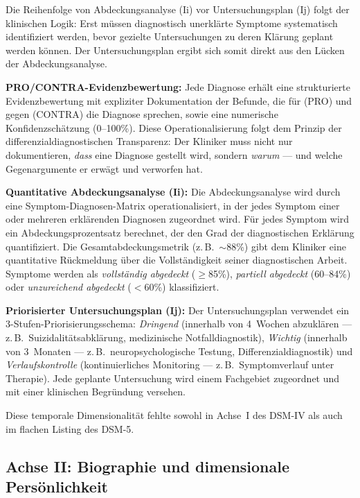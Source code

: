 \documentclass[11pt,a4paper]{article}
\begin{document}
Die Reihenfolge von Abdeckungsanalyse (Ii) vor Untersuchungsplan (Ij) folgt der klinischen Logik: Erst m\"ussen diagnostisch unerklärte Symptome systematisch identifiziert werden, bevor gezielte Untersuchungen zu deren Kl\"arung geplant werden k\"onnen. Der Untersuchungsplan ergibt sich somit direkt aus den L\"ucken der Abdeckungsanalyse.

\textbf{PRO/CONTRA-Evidenzbewertung:} Jede Diagnose erh\"alt eine strukturierte Evidenzbewertung mit expliziter Dokumentation der Befunde, die f\"ur (PRO) und gegen (CONTRA) die Diagnose sprechen, sowie eine numerische Konfidenzsch\"atzung (0--100\%). Diese Operationalisierung folgt dem Prinzip der differenzialdiagnostischen Transparenz: Der Kliniker muss nicht nur dokumentieren, \textit{dass} eine Diagnose gestellt wird, sondern \textit{warum} --- und welche Gegenargumente er erw\"agt und verworfen hat.

\textbf{Quantitative Abdeckungsanalyse (Ii):} Die Abdeckungsanalyse wird durch eine Symptom-Diagnosen-Matrix operationalisiert, in der jedes Symptom einer oder mehreren erkl\"arenden Diagnosen zugeordnet wird. F\"ur jedes Symptom wird ein Abdeckungsprozentsatz berechnet, der den Grad der diagnostischen Erkl\"arung quantifiziert. Die Gesamtabdeckungsmetrik (z.\,B.\ $\sim$88\%) gibt dem Kliniker eine quantitative R\"uckmeldung \"uber die Vollst\"andigkeit seiner diagnostischen Arbeit. Symptome werden als \textit{vollst\"andig abgedeckt} ($\geq$85\%), \textit{partiell abgedeckt} (60--84\%) oder \textit{unzureichend abgedeckt} ($<$60\%) klassifiziert.

\textbf{Priorisierter Untersuchungsplan (Ij):} Der Untersuchungsplan verwendet ein 3-Stufen-Priorisierungsschema: \textit{Dringend} (innerhalb von 4~Wochen abzukl\"aren --- z.\,B.\ Suizidalit\"atsabkl\"arung, medizinische Notfalldiagnostik), \textit{Wichtig} (innerhalb von 3~Monaten --- z.\,B.\ neuropsychologische Testung, Differenzialdiagnostik) und \textit{Verlaufskontrolle} (kontinuierliches Monitoring --- z.\,B.\ Symptomverlauf unter Therapie). Jede geplante Untersuchung wird einem Fachgebiet zugeordnet und mit einer klinischen Begr\"undung versehen.

Diese temporale Dimensionalit\"at fehlte sowohl in Achse~I des DSM-IV als auch im flachen Listing des DSM-5.

\subsection{Achse II: Biographie und dimensionale Pers\"onlichkeit}
\end{document}
